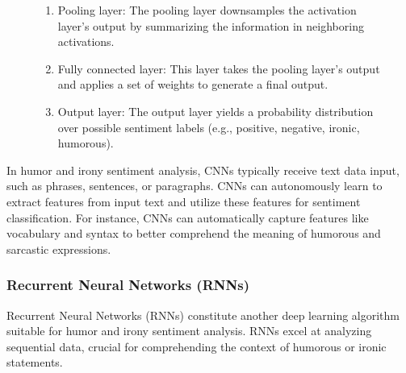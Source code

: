 \documentclass[a4paper]{article}
\begin{document}
\begin{figure}[H]
\begin{minipage}{0.48\textwidth}
\begin{enumerate}
            \item Pooling layer: The pooling layer downsamples the activation layer's output by summarizing the information in neighboring activations.
            \item Fully connected layer: This layer takes the pooling layer's output and applies a set of weights to generate a final output.
            \item Output layer: The output layer yields a probability distribution over possible sentiment labels (e.g., positive, negative, ironic, humorous).
        \end{enumerate}
    \end{minipage}
\end{figure}

In humor and irony sentiment analysis, CNNs typically receive text data input, such as phrases, sentences, or paragraphs. CNNs can autonomously learn to extract features from input text and utilize these features for sentiment classification. For instance, CNNs can automatically capture features like vocabulary and syntax to better comprehend the meaning of humorous and sarcastic expressions.

\subsubsection{Recurrent Neural Networks (RNNs)}

Recurrent Neural Networks (RNNs) constitute another deep learning algorithm suitable for humor and irony sentiment analysis. RNNs excel at analyzing sequential data, crucial for comprehending the context of humorous or ironic statements.
\end{document}
